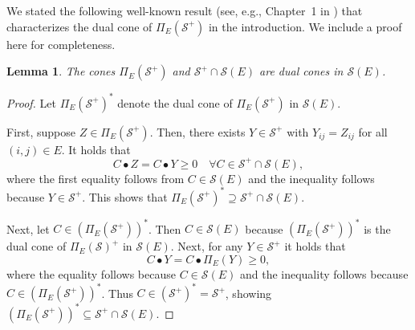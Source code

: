 \documentclass[twoside]{article}
\newtheorem{lemma}[thm]{Lemma}
\newcommand{\matip}[2]{#1 \bullet #2}
\begin{document}
	
	We stated the following well-known result (see, e.g., Chapter~1 in \cite{magron2023sparse}) that characterizes the dual cone of $\Pi_E(\mathcal{S}^+)$ in the introduction. We include a proof here for completeness.
	\begin{lemma}\label{thm:proj-esdp}
		The cones $\Pi_E(\mathcal{S}^+)$ and $\mathcal{S}^+ \cap \mathcal{S}(E)$ are dual cones in $\mathcal{S}(E)$.
	\end{lemma}
	\begin{proof}
		Let $\Pi_E(\mathcal{S}^+)^*$ denote the dual cone of $\Pi_E(\mathcal{S}^+)$ in $\mathcal{S}(E)$.
		
		First, suppose $Z \in \Pi_E(\mathcal{S}^+)$. Then,  there exists $Y \in \mathcal{S}^+$ with $Y_{ij} = Z_{ij}$ for all $(i,j) \in E$.  It holds that
		\[ \matip{C}{Z} = \matip{C}{Y} \geq 0 \quad \forall C \in \mathcal{S}^+ \cap \mathcal{S}(E),  \]
		where the first equality follows from $C \in \mathcal{S}(E)$ and the inequality follows because $Y \in \mathcal{S}^+$. This shows that $\Pi_E(\mathcal{S}^+)^* \supseteq \mathcal{S}^+ \cap \mathcal{S}(E)$.
		
		Next, let $C \in (\Pi_E(\mathcal{S}^+))^*$. Then $C \in \mathcal{S}(E)$ because $(\Pi_E(\mathcal{S}^+))^*$ is the dual cone of $\Pi_E(\mathcal{S})^+$ in $\mathcal{S}(E)$. Next, for any $Y \in \mathcal{S}^+$ it holds that
		\[ \matip{C}{Y} = \matip{C}{\Pi_E(Y)} \geq 0, \]
		where the equality follows because $C \in \mathcal{S}(E)$ and the inequality follows because $C \in (\Pi_E(\mathcal{S}^+))^*$. Thus $C \in (\mathcal{S}^+)^*=\mathcal{S}^+$, showing $(\Pi_E(\mathcal{S}^+))^* \subseteq \mathcal{S}^+ \cap \mathcal{S}(E)$.
	\end{proof}
	
\end{document}
